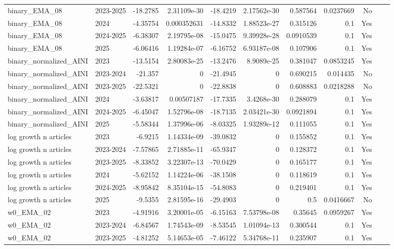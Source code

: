 \begin{longtable}{llrrrrrrrrl}
binary\_EMA\_08 & 2023-2025 & -18.2785 & 2.31109e-30 & -18.4219 & 2.17562e-30 & 0.587564 & 0.0237669 & No \\
binary\_EMA\_08 & 2024 & -4.35754 & 0.000352631 & -14.8332 & 1.88523e-27 & 0.315126 & 0.1 & Yes \\
binary\_EMA\_08 & 2024-2025 & -6.38307 & 2.19795e-08 & -15.0475 & 9.39928e-28 & 0.0910539 & 0.1 & Yes \\
binary\_EMA\_08 & 2025 & -6.06416 & 1.19284e-07 & -6.16752 & 6.93187e-08 & 0.107906 & 0.1 & Yes \\
binary\_normalized\_AINI & 2023 & -13.5154 & 2.80083e-25 & -13.2476 & 8.9089e-25 & 0.381047 & 0.0853245 & Yes \\
binary\_normalized\_AINI & 2023-2024 & -21.357 & 0 & -21.4945 & 0 & 0.690215 & 0.014435 & No \\
binary\_normalized\_AINI & 2023-2025 & -22.5321 & 0 & -22.8838 & 0 & 0.608883 & 0.0218288 & No \\
binary\_normalized\_AINI & 2024 & -3.63817 & 0.00507187 & -17.7335 & 3.4268e-30 & 0.288079 & 0.1 & Yes \\
binary\_normalized\_AINI & 2024-2025 & -6.45047 & 1.52796e-08 & -18.7135 & 2.03421e-30 & 0.0921894 & 0.1 & Yes \\
binary\_normalized\_AINI & 2025 & -5.58344 & 1.37996e-06 & -8.03325 & 1.93289e-12 & 0.111055 & 0.1 & Yes \\
log growth n articles & 2023 & -6.9215 & 1.14334e-09 & -39.0832 & 0 & 0.155852 & 0.1 & Yes \\
log growth n articles & 2023-2024 & -7.57865 & 2.71885e-11 & -65.9347 & 0 & 0.128372 & 0.1 & Yes \\
log growth n articles & 2023-2025 & -8.33852 & 3.22307e-13 & -70.0429 & 0 & 0.165177 & 0.1 & Yes \\
log growth n articles & 2024 & -5.62152 & 1.14224e-06 & -38.1508 & 0 & 0.118619 & 0.1 & Yes \\
log growth n articles & 2024-2025 & -8.95842 & 8.35104e-15 & -54.8083 & 0 & 0.219401 & 0.1 & Yes \\
log growth n articles & 2025 & -9.5355 & 2.81595e-16 & -29.4903 & 0 & 0.5 & 0.0416667 & No \\
w0\_EMA\_02 & 2023 & -4.91916 & 3.20001e-05 & -6.15163 & 7.53798e-08 & 0.35645 & 0.0959267 & Yes \\
w0\_EMA\_02 & 2023-2024 & -6.84567 & 1.74543e-09 & -8.53545 & 1.01094e-13 & 0.300544 & 0.1 & Yes \\
w0\_EMA\_02 & 2023-2025 & -4.81252 & 5.14653e-05 & -7.46122 & 5.34768e-11 & 0.235907 & 0.1 & Yes \\

\end{longtable}

